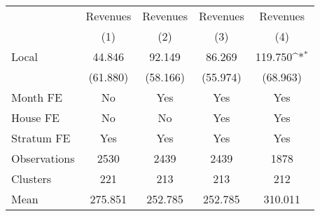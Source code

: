 {
\def\sym#1{\ifmmode^{#1}\else\(^{#1}\)\fi}
\begin{tabular}{l*{4}{c}}
\toprule
                &\multicolumn{1}{c}{Revenues}&\multicolumn{1}{c}{Revenues}&\multicolumn{1}{c}{Revenues}&\multicolumn{1}{c}{Revenues}\\
                &\multicolumn{1}{c}{(1)}         &\multicolumn{1}{c}{(2)}         &\multicolumn{1}{c}{(3)}         &\multicolumn{1}{c}{(4)}         \\
\midrule
Local           &   44.846         &   92.149         &   86.269         &  119.750\sym{*}  \\
                & (61.880)         & (58.166)         & (55.974)         & (68.963)         \\
Month FE        &       No         &      Yes         &      Yes         &      Yes         \\
House FE        &       No         &       No         &      Yes         &      Yes         \\
Stratum FE      &      Yes         &      Yes         &      Yes         &      Yes         \\
\midrule
Observations    &     2530         &     2439         &     2439         &     1878         \\
Clusters        &      221         &      213         &      213         &      212         \\
Mean            &  275.851         &  252.785         &  252.785         &  310.011         \\
\bottomrule
\end{tabular}
}
